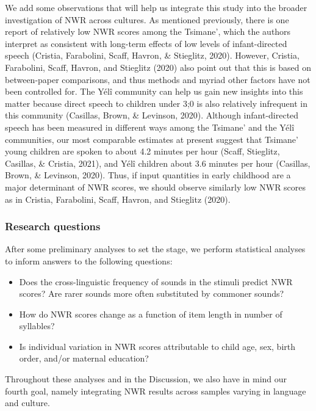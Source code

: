 \documentclass[
  english,
  ,man,floatsintext]{apa6}
\providecommand{\tightlist}{%
  \setlength{\itemsep}{0pt}\setlength{\parskip}{0pt}}
\begin{document}
We add some observations that will help us integrate this study into the broader investigation of NWR across cultures. As mentioned previously, there is one report of relatively low NWR scores among the Tsimane', which the authors interpret as consistent with long-term effects of low levels of infant-directed speech (Cristia, Farabolini, Scaff, Havron, \& Stieglitz, 2020). However, Cristia, Farabolini, Scaff, Havron, and Stieglitz (2020) also point out that this is based on between-paper comparisons, and thus methods and myriad other factors have not been controlled for. The Yélî community can help us gain new insights into this matter because direct speech to children under 3;0 is also relatively infrequent in this community (Casillas, Brown, \& Levinson, 2020). Although infant-directed speech has been measured in different ways among the Tsimane' and the Yélî communities, our most comparable estimates at present suggest that Tsimane' young children are spoken to about 4.2 minutes per hour (Scaff, Stieglitz, Casillas, \& Cristia, 2021), and Yélî children about 3.6 minutes per hour (Casillas, Brown, \& Levinson, 2020). Thus, if input quantities in early childhood are a major determinant of NWR scores, we should observe similarly low NWR scores as in Cristia, Farabolini, Scaff, Havron, and Stieglitz (2020).

\hypertarget{research-questions}{%
\subsubsection{Research questions}\label{research-questions}}

After some preliminary analyses to set the stage, we perform statistical analyses to inform answers to the following questions:

\begin{itemize}
\tightlist
\item
  Does the cross-linguistic frequency of sounds in the stimuli predict NWR scores? Are rarer sounds more often substituted by commoner sounds?
\item
  How do NWR scores change as a function of item length in number of syllables?
\item
  Is individual variation in NWR scores attributable to child age, sex, birth order, and/or maternal education?
\end{itemize}

Throughout these analyses and in the Discussion, we also have in mind our fourth goal, namely integrating NWR results across samples varying in language and culture.
\end{document}
